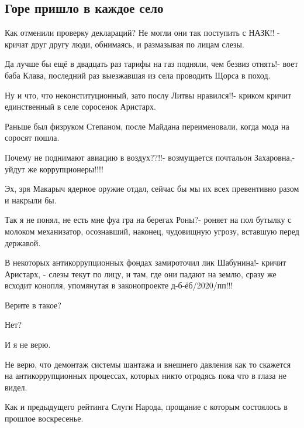  
 
 

\subsection{Горе пришло в каждое село}


Как отменили проверку деклараций? Не могли они так поступить с НАЗК!! - кричат
друг другу люди, обнимаясь, и размазывая по лицам слезы.

Да лучше бы ещё в двадцать раз тарифы на газ подняли, чем безвиз отнять!- воет
баба Клава, последний раз выезжавшая из села проводить Щорса в поход.

Ну и что, что неконституционный, зато послу Литвы нравился!!- криком кричит
единственный в селе соросенок Аристарх.

Раньше был физруком Степаном, после Майдана переименовали, когда мода на соросят пошла.

Почему не поднимают авиацию в воздух??!!- возмущается почтальон Захаровна,- уйдут же коррупционеры!!!!

Эх, зря Макарыч ядерное оружие отдал, сейчас бы мы их всех превентивно разом и накрыли бы.

Так я не понял, не есть мне фуа гра на берегах Роны?- роняет на пол бутылку с
молоком механизатор, осознавший, наконец, чудовищную угрозу, вставшую перед
державой.

В некоторых антикоррупционных фондах замироточил лик Шабунина!- кричит
Аристарх, - слезы текут по лицу, и там, где они падают на землю, сразу же
всходит конопля, упомянутая в законопроекте д-б-ёб/2020/пп!!!

Верите в такое?

Нет?

И я не верю.

Не верю, что демонтаж системы шантажа и внешнего давления как то скажется на антикоррупционных процессах, которых никто отродясь пока что в глаза не видел.

Как и предыдущего рейтинга Слуги Народа, прощание с которым состоялось в прошлое воскресенье.

